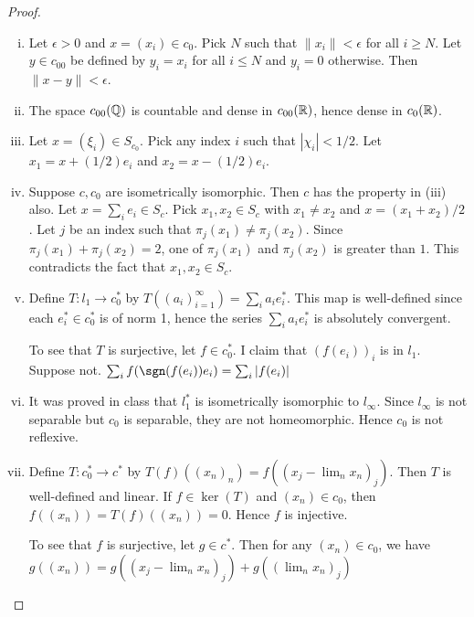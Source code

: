 \documentclass{article}
\begin{document}
\begin{proof}
\begin{enumerate}[i)]
\item Let $\epsilon > 0$ and $x = (x_i) \in c_0$. Pick $N$ such that $\|x_i\| < \epsilon$ for all $i \ge N$. Let $y \in c_{00}$ be defined by $y_i = x_i$ for all $i \le N$ and $y_i = 0$ otherwise. Then $\|x - y\| < \epsilon$.

\item The space $c_{00}(\mathbb{Q})$ is countable and dense in $c_{00}(\mathbb{R})$, hence dense in $c_0(\mathbb{R})$.

\item Let $x = (\xi_i) \in S_{c_0}$.  Pick any index $i$ such that $|\chi_i| < 1/2$.  Let $x_1 = x + (1/2) e_i$ and $x_2 = x - (1/2) e_i$.

\item Suppose $c, c_0$ are isometrically isomorphic.  Then $c$ has the property in (iii) also. Let $x = \sum_i e_i \in S_c$.  Pick $x_1, x_2 \in S_c$ with $x_1 \neq x_2$ and $x = (x_1 + x_2)/2$.  Let $j$ be an index such that $\pi_j(x_1) \neq \pi_j(x_2)$.  Since $\pi_j(x_1) + \pi_j(x_2) = 2$, one of $\pi_j(x_1)$ and $\pi_j(x_2)$ is greater than $1$. This contradicts the fact that $x_1, x_2 \in S_c$.

\item Define $T: l_1 \to c_0^*$ by $T((a_i)_{i=1}^\infty) = \sum_i a_i e_i^*$. This map is well-defined since each $e_i^* \in c_0^*$ is of norm 1, hence the series $\sum_i a_i e_i^*$ is absolutely convergent.   



To see that $T$ is surjective, let $f \in c_0^*$. I claim that $(f(e_i))_i$ is in $l_1$.  Suppose not. $\sum_i f(\sgn(f(e_i)) e_i) = \sum_i |f(e_i)|$

\item It was proved in class that $l_1^*$ is isometrically isomorphic to $l_\infty$.  Since $l_\infty$ is not separable but $c_0$ is separable, they are not homeomorphic.  Hence $c_0$ is not reflexive.

\item Define $T: c_0^* \to c^*$ by $T(f)((x_n)_n) = f((x_j - \lim_n x_n)_j)$. Then $T$ is well-defined and linear. If $f \in \ker(T)$ and $(x_n) \in c_0$, then $f((x_n)) = T(f)((x_n)) = 0$.  Hence $f$ is injective.



To see that $f$ is surjective, let $g \in c^*$. Then for any $(x_n) \in c_0$, we have $g((x_n)) = g((x_j - \lim_n x_n)_j) + g((\lim_n x_n)_j)$

\end{enumerate}

\end{proof}
\end{document}
